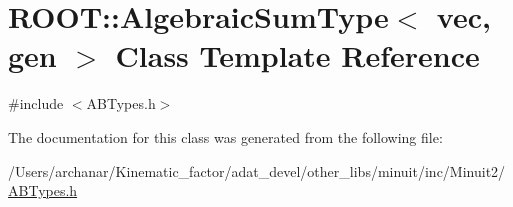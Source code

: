 \hypertarget{classROOT_1_1Minuit2_1_1AlgebraicSumType_3_01vec_00_01gen_01_4}{}\section{R\+O\+OT\+:\+:Algebraic\+Sum\+Type$<$ vec, gen $>$ Class Template Reference}
\label{classROOT_1_1Minuit2_1_1AlgebraicSumType_3_01vec_00_01gen_01_4}


{\ttfamily \#include $<$A\+B\+Types.\+h$>$}



The documentation for this class was generated from the following file\+:\begin{DoxyCompactItemize}
\item 
/\+Users/archanar/\+Kinematic\+\_\+factor/adat\+\_\+devel/other\+\_\+libs/minuit/inc/\+Minuit2/\mbox{\hyperlink{other__libs_2minuit_2inc_2Minuit2_2ABTypes_8h}{A\+B\+Types.\+h}}\end{DoxyCompactItemize}
